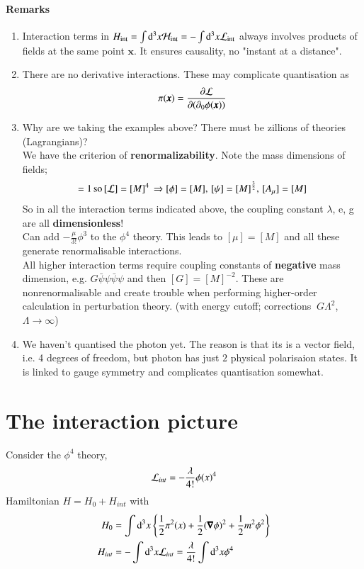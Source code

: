 \paragraph{Remarks}
\begin{enumerate}
	\item Interaction terms in $H_\text{int} = \int \dd^3x \mathcal{H}_\text{int} = - \int\dd^3x\mathcal{L}_\text{int}$ always involves products of fields at the same point $\pmb{x}$. It ensures causality, no "instant at a distance".
	\item There are no derivative interactions. These may complicate quantisation as $$\pi(\pmb{x}) = \frac{\partial\mathcal{L}}{\partial(\partial_0 \phi(\pmb{x}))}$$
	\item Why are we taking the examples above? There must be zillions of theories (Lagrangians)? \\
			We have the criterion of \textbf{renormalizability}. Note the mass dimensions of fields;
			\begin{align*}
				[S] = 1 \, \text{so} \, [\lag] = [M]^4 \, \Rightarrow [\phi] = [M] ,\, [\psi] = [M]^{\frac{3}{2}} ,\, [A_\mu] = [M]
			\end{align*}
			So in all the interaction terms indicated above, the coupling constant $\lambda$, e, g are all \textbf{dimensionless}!\\
			Can add $-\frac{\mu}{3!}\phi^3$ to the $\phi^4$ theory. This leads to $[\mu] = [M]$ and all these generate renormalisable interactions. \\
			All higher interaction terms require coupling constants of \textbf{negative} mass dimension, e.g. $G\bar{\psi}\psi\bar{\psi}\psi$ and then $[G] = [M]^{-2}$. These are nonrenormalisable and create trouble when performing higher-order calculation in perturbation theory.
			(with energy cutoff; corrections $~G\Lambda^2$, $\Lambda \rightarrow \infty$)
		\item We haven't quantised the photon yet. The reason is that its is a vector field, i.e. 4 degrees of freedom, but photon has just $2$ physical polarisaion states. It is linked to gauge symmetry and complicates quantisation somewhat.
\end{enumerate}
\section{The interaction picture}
Consider the $\phi^4$ theory, 
\begin{align}
\mathcal{L}_{int} = -\frac{\lambda}{4!} \phi(x)^4
\end{align}
Hamiltonian $H = H_0 + H_{int}$ with 
\begin{align}
	H_0 &= \int\dd^3 x \left\{ \frac{1}{2}\pi^2(x) + \frac{1}{2}(\pmb{\nabla}\phi)^2 + \frac{1}{2}m^2\phi^2 \right\}\\
	H_{int} &= -\int\dd^3x \mathcal{L}_{int} = \frac{\lambda}{4!}\int\dd^3x \phi^4 
\end{align}

